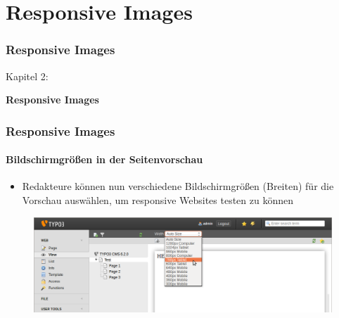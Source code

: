 %

\section{Responsive Images}
\begin{frame}[fragile]
	\frametitle{Responsive Images}

	\begin{center}\huge{Kapitel 2:}\end{center}
	\begin{center}\huge{\color{typo3darkgrey}\textbf{Responsive Images}}\end{center}

\end{frame}


\begin{frame}[fragile]
	\frametitle{Responsive Images}
	\framesubtitle{Bildschirmgrößen in der Seitenvorschau}

	\begin{itemize}
		\item Redakteure können nun verschiedene Bildschirmgrößen (Breiten) für die Vorschau auswählen, um responsive Websites testen zu können
	\end{itemize}

	\begin{figure}
		\includegraphics[width=0.95\linewidth]{Images/ResponsiveImages/ScreenSizeInPagePreview.png}
	\end{figure}

\end{frame}


